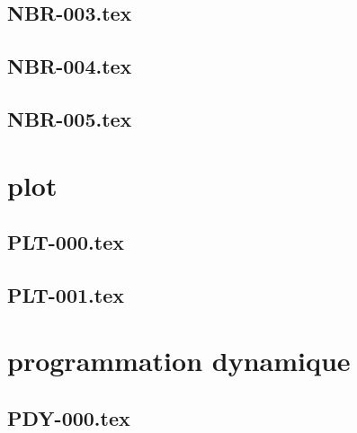 \subsection*{\xxexo} 
\graphicspath{{../../exos/nombres/NBR-002/}}
 
 
\renewcommand{\xxexo}{NBR-003.tex} 
\subsection*{\xxexo} 
\graphicspath{{../../exos/nombres/NBR-003/}}
 
 
\renewcommand{\xxexo}{NBR-004.tex} 
\subsection*{\xxexo} 
\graphicspath{{../../exos/nombres/NBR-004/}}
 
 
\renewcommand{\xxexo}{NBR-005.tex} 
\subsection*{\xxexo} 
\graphicspath{{../../exos/nombres/NBR-005/}}
 
 
\section*{plot}
\renewcommand{\xxexo}{PLT-000.tex} 
\subsection*{\xxexo} 
\graphicspath{{../../exos/plot/PLT-000/}}
 
 
\renewcommand{\xxexo}{PLT-001.tex} 
\subsection*{\xxexo} 
\graphicspath{{../../exos/plot/PLT-001/}}
 
 
\section*{programmation dynamique}
\renewcommand{\xxexo}{PDY-000.tex} 
\subsection*{\xxexo} 
\graphicspath{{../../exos/programmation_dynamique/PDY-000/}}
 
 
